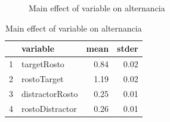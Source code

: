 \documentclass{article}
\begin{document}
\begin{figure}[H]
  \caption{Main effect of variable on alternancia}
  \noindent{}
  \centering
\end{figure}

\begin{table}[ht]
\caption{Main effect of variable on alternancia}
\centering
\begin{tabular}{rlrr}
  \hline
 & variable & mean & stder \\ 
  \hline
  1 & targetRosto & 0.84 & 0.02 \\ 
  2 & rostoTarget & 1.19 & 0.02 \\ 
  3 & distractorRosto & 0.25 & 0.01 \\ 
  4 & rostoDistractor & 0.26 & 0.01 \\ 
   \hline
\end{tabular}
\end{table}
\end{document}

